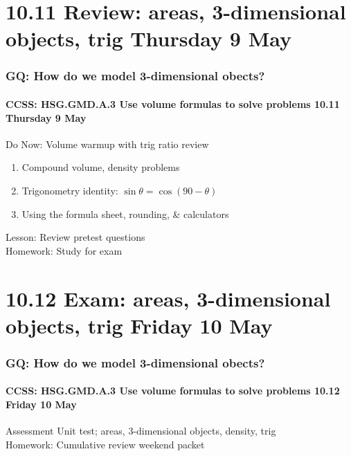 \documentclass{beamer}
\begin{document}
  \section{10.11 Review: areas, 3-dimensional objects, trig Thursday 9 May}
    \frame
    {
      \frametitle{GQ: How do we model 3-dimensional obects?}
      \framesubtitle{CCSS: HSG.GMD.A.3 Use volume formulas to solve problems \hfill \alert{10.11 Thursday 9 May}}
      \begin{block}{Do Now: Volume warmup with trig ratio review}
        \begin{enumerate}
          \item Compound volume, density problems
          \item Trigonometry identity: $\sin \theta = \cos (90-\theta)$
          \item Using the formula sheet, rounding, \& calculators
      \end{enumerate}
      \end{block}
      Lesson: Review pretest questions\\[1cm]
      Homework: Study for exam
    }

  \section{10.12 Exam: areas, 3-dimensional objects, trig Friday 10 May}
    \frame
    {
      \frametitle{GQ: How do we model 3-dimensional obects?}
      \framesubtitle{CCSS: HSG.GMD.A.3 Use volume formulas to solve problems \hfill \alert{10.12 Friday 10 May}}

      Assessment Unit test; areas, 3-dimensional objects, density, trig \\[1cm]
      Homework: Cumulative review weekend packet
    }
\end{document}
